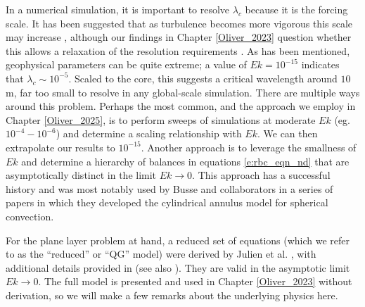 In a numerical simulation, it is important to resolve $\lambda_{c}$ because it is the forcing scale.
It has been suggested that as turbulence becomes more vigorous this scale may increase \citep{jA20,cG19,cG25}, although our findings in Chapter \ref{Oliver_2023} question whether this allows a relaxation of the resolution requirements \citep{tO23}.
As has been mentioned, geophysical parameters can be quite extreme; 
a value of $Ek = 10^{-15}$ indicates that $\lambda_{c}\sim 10^{-5}.$ Scaled to the core, this suggests a critical wavelength around $10$ m, far too small to resolve in any global-scale simulation. There are multiple ways around this problem. Perhaps the most common, and the approach we employ in Chapter \ref{Oliver_2025}, is to perform sweeps of simulations at moderate $Ek$ (eg. $ 10^{-4}-10^{-6}$) and determine a scaling relationship with $Ek$. We can then extrapolate our results to $10^{-15}.$
Another approach is to leverage the smallness of $Ek$ and determine a hierarchy of balances in equations \ref{e:rbc_eqn_nd} that are asymptotically distinct in the limit $Ek\rightarrow 0.$ 
This approach has a successful history and was most notably used by Busse and collaborators in a series of papers \citep{fB70,fB86a,fB86c} in which they developed the cylindrical annulus model for spherical convection. 

For the plane layer problem at hand, a reduced set of equations (which we refer to as the ``reduced'' or  ``QG'' model) were derived by Julien et al. \citep{kJ98a}, with additional details provided in \citep{mS06} (see also \citep{kJ12b,sM21,aR14}).
They are valid in the asymptotic limit $Ek\rightarrow 0.$
The full model is presented and used in Chapter \ref{Oliver_2023} without derivation, so we will make a few remarks about the underlying physics here.
